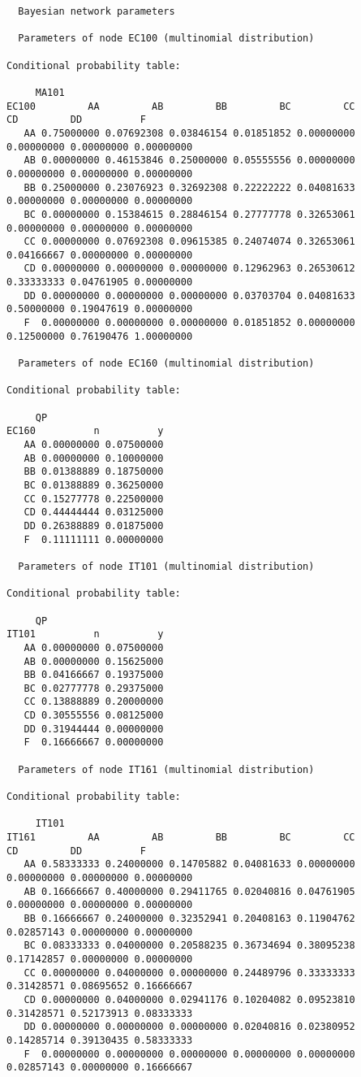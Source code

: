 \documentclass[
]{article}
\begin{document}
\begin{verbatim}
  Bayesian network parameters

  Parameters of node EC100 (multinomial distribution)

Conditional probability table:
 
     MA101
EC100         AA         AB         BB         BC         CC         CD         DD          F
   AA 0.75000000 0.07692308 0.03846154 0.01851852 0.00000000 0.00000000 0.00000000 0.00000000
   AB 0.00000000 0.46153846 0.25000000 0.05555556 0.00000000 0.00000000 0.00000000 0.00000000
   BB 0.25000000 0.23076923 0.32692308 0.22222222 0.04081633 0.00000000 0.00000000 0.00000000
   BC 0.00000000 0.15384615 0.28846154 0.27777778 0.32653061 0.00000000 0.00000000 0.00000000
   CC 0.00000000 0.07692308 0.09615385 0.24074074 0.32653061 0.04166667 0.00000000 0.00000000
   CD 0.00000000 0.00000000 0.00000000 0.12962963 0.26530612 0.33333333 0.04761905 0.00000000
   DD 0.00000000 0.00000000 0.00000000 0.03703704 0.04081633 0.50000000 0.19047619 0.00000000
   F  0.00000000 0.00000000 0.00000000 0.01851852 0.00000000 0.12500000 0.76190476 1.00000000

  Parameters of node EC160 (multinomial distribution)

Conditional probability table:
 
     QP
EC160          n          y
   AA 0.00000000 0.07500000
   AB 0.00000000 0.10000000
   BB 0.01388889 0.18750000
   BC 0.01388889 0.36250000
   CC 0.15277778 0.22500000
   CD 0.44444444 0.03125000
   DD 0.26388889 0.01875000
   F  0.11111111 0.00000000

  Parameters of node IT101 (multinomial distribution)

Conditional probability table:
 
     QP
IT101          n          y
   AA 0.00000000 0.07500000
   AB 0.00000000 0.15625000
   BB 0.04166667 0.19375000
   BC 0.02777778 0.29375000
   CC 0.13888889 0.20000000
   CD 0.30555556 0.08125000
   DD 0.31944444 0.00000000
   F  0.16666667 0.00000000

  Parameters of node IT161 (multinomial distribution)

Conditional probability table:
 
     IT101
IT161         AA         AB         BB         BC         CC         CD         DD          F
   AA 0.58333333 0.24000000 0.14705882 0.04081633 0.00000000 0.00000000 0.00000000 0.00000000
   AB 0.16666667 0.40000000 0.29411765 0.02040816 0.04761905 0.00000000 0.00000000 0.00000000
   BB 0.16666667 0.24000000 0.32352941 0.20408163 0.11904762 0.02857143 0.00000000 0.00000000
   BC 0.08333333 0.04000000 0.20588235 0.36734694 0.38095238 0.17142857 0.00000000 0.00000000
   CC 0.00000000 0.04000000 0.00000000 0.24489796 0.33333333 0.31428571 0.08695652 0.16666667
   CD 0.00000000 0.04000000 0.02941176 0.10204082 0.09523810 0.31428571 0.52173913 0.08333333
   DD 0.00000000 0.00000000 0.00000000 0.02040816 0.02380952 0.14285714 0.39130435 0.58333333
   F  0.00000000 0.00000000 0.00000000 0.00000000 0.00000000 0.02857143 0.00000000 0.16666667


\end{verbatim}
\end{document}

